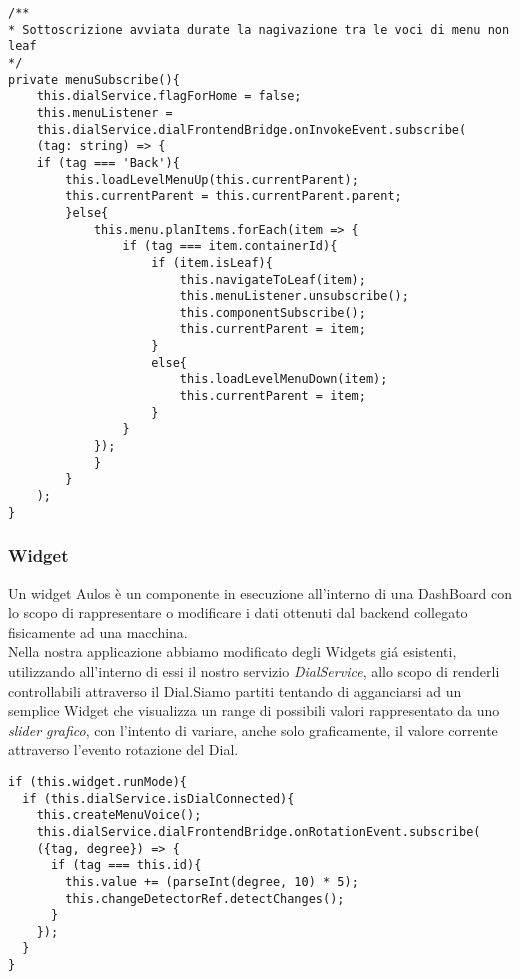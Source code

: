 \vspace{1.0cm}
\begin{lstlisting}[caption={Metodo menuSubscribe},style=javaScriptCode]
/**
* Sottoscrizione avviata durate la nagivazione tra le voci di menu non leaf
*/
private menuSubscribe(){
	this.dialService.flagForHome = false;
	this.menuListener = 
	this.dialService.dialFrontendBridge.onInvokeEvent.subscribe(
	(tag: string) => {
	if (tag === 'Back'){
		this.loadLevelMenuUp(this.currentParent);
		this.currentParent = this.currentParent.parent;
		}else{
			this.menu.planItems.forEach(item => {
				if (tag === item.containerId){
					if (item.isLeaf){
						this.navigateToLeaf(item);
						this.menuListener.unsubscribe();
						this.componentSubscribe();
						this.currentParent = item;
					}
					else{
						this.loadLevelMenuDown(item);
						this.currentParent = item;
					}
				}
			});
			}
		}
	);
}

\end{lstlisting} 
\vspace{1.0cm}

\subsubsection{Widget}

Un widget Aulos è un componente in esecuzione all’interno di una DashBoard con lo scopo di rappresentare o modificare i dati ottenuti dal backend collegato fisicamente ad una macchina.\\

Nella nostra applicazione abbiamo modificato degli Widgets giá esistenti, utilizzando all'interno di essi il nostro servizio \emph{DialService}, allo scopo di renderli controllabili attraverso il Dial.Siamo partiti tentando di agganciarsi ad un semplice Widget che visualizza un range di possibili valori rappresentato da uno \emph{slider grafico}, con l'intento di variare, anche solo graficamente, il valore corrente attraverso l'evento rotazione del Dial.\\

\begin{lstlisting}[caption={Sottoscrizione evento rotazione Radial Gauge},style=javaScriptCode]
if (this.widget.runMode){
  if (this.dialService.isDialConnected){
	this.createMenuVoice();
	this.dialService.dialFrontendBridge.onRotationEvent.subscribe(
	({tag, degree}) => {
	  if (tag === this.id){
		this.value += (parseInt(degree, 10) * 5);
		this.changeDetectorRef.detectChanges();
	  }
	});
  }
}
\end{lstlisting} 


